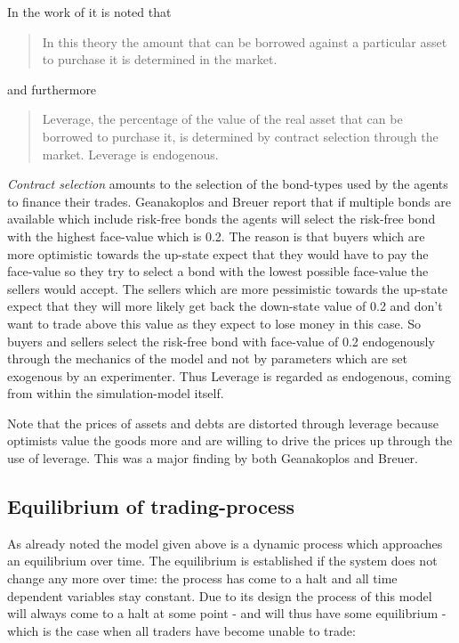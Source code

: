 \documentclass[../Bachelorarbeit.tex]{subfiles}
\begin{document}
\medskip
In the work of \cite{Breuer2015} it is noted that 
\begin{quote}
In this theory the amount that can be borrowed against a particular asset to purchase it is determined in the market.
\end{quote}

and furthermore

\begin{quote}
Leverage, the percentage of the value of the real asset that can be borrowed to purchase it, is determined by contract selection through the market. Leverage is endogenous.
\end{quote}

\textit{Contract selection} amounts to the selection of the bond-types used by the agents to finance their trades. Geanakoplos and Breuer report that if multiple bonds are available which include risk-free bonds the agents will select the risk-free bond with the highest face-value which is 0.2. The reason is that buyers which are more optimistic towards the up-state expect that they would have to pay the face-value so they try to select a bond with the lowest possible face-value the sellers would accept. The sellers which are more pessimistic towards the up-state expect that they will more likely get back the down-state value of 0.2 and don't want to trade above this value as they expect to lose money in this case. So buyers and sellers select the risk-free bond with face-value of 0.2 endogenously through the mechanics of the model and not by parameters which are set exogenous by an experimenter. Thus Leverage is regarded as endogenous, coming from within the simulation-model itself.

\medskip

Note that the prices of assets and debts are distorted through leverage because optimists value the goods more and are willing to drive the prices up through the use of leverage. This was a major finding by both Geanakoplos and Breuer.

\subsection{Equilibrium of trading-process}
As already noted the model given above is a dynamic process which approaches an equilibrium over time. The equilibrium is established if the system does not change any more over time: the process has come to a halt and all time dependent variables stay constant. Due to its design the process of this model will always come to a halt at some point - and will thus have some equilibrium - which is the case when all traders have become unable to trade:
\end{document}
